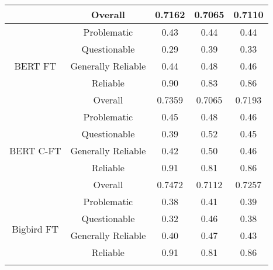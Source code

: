 \begin{table}[htbp]
\begin{longtable}{| c | c | c | c | c |}
                                                          & Overall            & 0.7162             & 0.7065          & 0.7110          \\
        \hline
        \multirow{5}{*}{BERT FT}                          & Problematic        & 0.43               & 0.44            & 0.44            \\
                                                          & Questionable       & 0.29               & 0.39            & 0.33            \\
                                                          & Generally Reliable & 0.44               & 0.48            & 0.46            \\
                                                          & Reliable           & 0.90               & 0.83            & 0.86            \\\cline{2-5}
                                                          & Overall            & 0.7359             & 0.7065          & 0.7193          \\
        \hline
        \multirow{5}{*}{BERT C-FT}                        & Problematic        & 0.45               & 0.48            & 0.46            \\
                                                          & Questionable       & 0.39               & 0.52            & 0.45            \\
                                                          & Generally Reliable & 0.42               & 0.50            & 0.46            \\
                                                          & Reliable           & 0.91               & 0.81            & 0.86            \\\cline{2-5}
                                                          & Overall            & 0.7472             & 0.7112          & 0.7257          \\
        \hline
        \multirow{5}{*}{Bigbird FT}                       & Problematic        & 0.38               & 0.41            & 0.39            \\
                                                          & Questionable       & 0.32               & 0.46            & 0.38            \\
                                                          & Generally Reliable & 0.40               & 0.47            & 0.43            \\
                                                          & Reliable           & 0.91               & 0.81            & 0.86            \\\cline{2-5}

\end{longtable}
\end{table}
